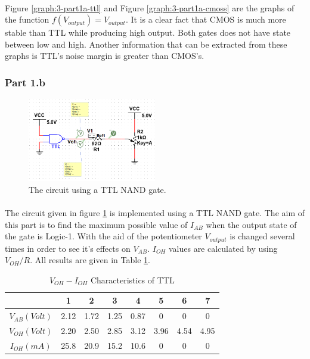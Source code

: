 \documentclass[pdftex,12pt,a4paper]{article}
\begin{document}
\begin{flushleft}
\paragraph{}
Figure \ref{graph:3-part1a-ttl} and Figure \ref{graph:3-part1a-cmoss} are the graphs of the function $f(V_{output}) = V_{output}$. It is a clear fact that CMOS is much more stable than TTL while producing high output. Both gates does not have state between low and high. Another information that can be extracted from these graphs is TTL's noise margin is greater than CMOS's.  
\end{flushleft}






\newpage
\begin{flushleft}
\subsubsection{Part 1.b}


 \begin{figure}[h]
    	\centering
    	\includegraphics[width=0.5\textwidth]{part1b-ttl.png}	
    	\caption{The circuit using a TTL NAND gate.}
    	\label{fig:3-part1b-ttl}
\end{figure}

\paragraph{}The circuit given in figure \ref{fig:3-part1b-ttl} is implemented using a TTL NAND gate. The aim of this part is to find the maximum possible value of $I_{AB}$ when the output state of the gate is Logic-1. With the aid of the potentiometer $V_{output}$ is changed several times in order to see it's effects on $V_{AB}$. $I_{OH}$ values are calculated by using $V_{OH}/R$. All results are given in Table \ref{part1b-ttl}.

\begin{table}[h]
\begin{tabular}{c|c|c|c|c|c|c|c|}
                & 1    & 2    & 3    & 4    & 5    & 6    & 7    \\ \hline
$V_{AB} (Volt)$ & 2.12 & 1.72 & 1.25 & 0.87 & 0    & 0    & 0    \\ \hline
$V_{OH} (Volt)$ & 2.20 & 2.50 & 2.85 & 3.12 & 3.96 & 4.54 & 4.95 \\ \hline
$I_{OH} (mA)$   & 25.8 & 20.9 & 15.2 & 10.6 & 0    & 0    & 0   
\end{tabular}
\centering
\caption{$V_{OH} - I_{OH}$ Characteristics of TTL}
\label{part1b-ttl}
\end{table}



\end{flushleft}
\end{document}

